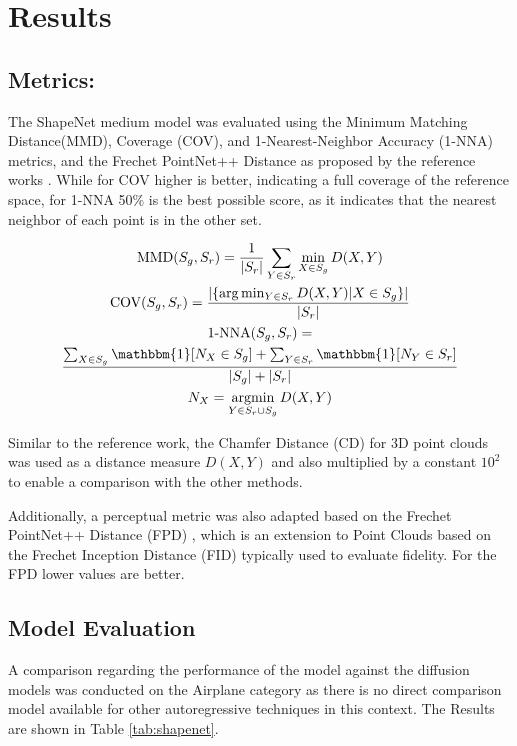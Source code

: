 


\section{Results}

\subsection*{Metrics: }

The ShapeNet medium model was evaluated using the Minimum Matching Distance(MMD), Coverage (COV), and 1-Nearest-Neighbor Accuracy (1-NNA) metrics, and the Frechet PointNet++ Distance  as proposed by the reference  works \cite{erkoç2023hyperdiffusion}.
While for COV higher is better, indicating a full coverage of the reference space, for 1-NNA 50\% is the best possible score, as it indicates that the nearest neighbor of each point is in the other set.

\begin{gather*}
  \mathrm{MMD}(S_g,S_r) =\frac{1}{|S_{r}|}\sum_{Y\in S_{r}}\min_{X\in S_{g}}D(X,Y)\\
  \text{COV}(S_g,S_r) =\frac{|\{\arg\min_{Y\in S_r}D(X,Y)|X\in S_g\}|}{|S_r|}\\
  \text{1-NNA}(S_g,S_r) =\\
  \frac{\sum_{X\in S_g}\mathbbm{1}[N_X\in S_g]+\sum_{Y\in S_r}\mathbbm{1}[N_Y\in S_r]}{|S_g|+|S_r|}\\
  N_X = \underset{Y\in S_r \cup S_g}{\text{argmin}} \, D(X,Y) \\
\end{gather*}

Similar to the reference work, the Chamfer Distance (CD) for 3D point clouds was used as a distance measure $D(X, Y)$ and also multiplied by a constant $10^2$ to enable a comparison with the other methods.

Additionally, a perceptual metric was also adapted based on the Frechet PointNet++ Distance (FPD) \cite{qi2017pointnetdeephierarchicalfeature}, which is an extension to Point Clouds based on the Frechet Inception Distance (FID) \cite{NIPS2017_8a1d6947} typically used to evaluate fidelity. For the FPD lower values are better.

\subsection*{Model Evaluation}

A comparison regarding the performance of the model against the diffusion models was conducted on the Airplane category as there is no direct comparison model available for other autoregressive techniques in this context. The Results are shown in Table \ref{tab:shapenet}.

